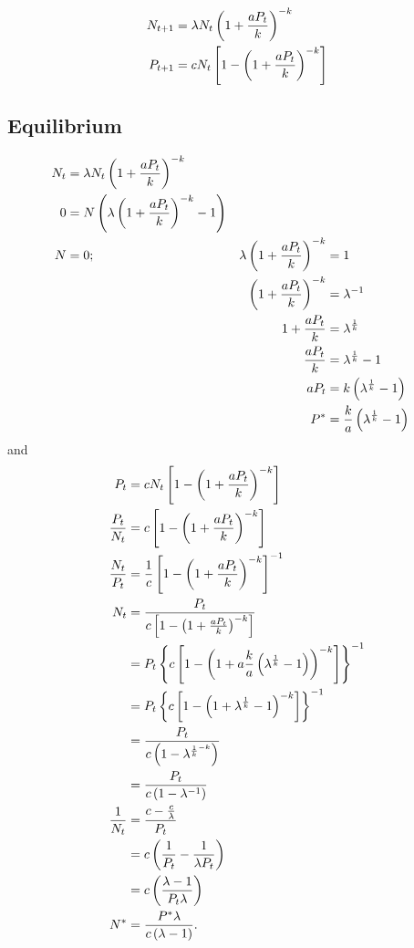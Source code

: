 \documentclass{article}
\begin{document}
\begin{align*}
    N_{t+1} &= \lambda N_t \left(1+\frac{aP_t}{k}\right)^{-k}\\
    P_{t+1} &= c N_t \left[1-\left(1+\frac{aP_t}{k}\right)^{-k}\right]
\end{align*}

\subsection{Equilibrium}
\begin{alignat*}{4}
    N_t &= \lambda N_t \left(1+\frac{aP_t}{k}\right)^{-k}\\
    0   &= N\left(\lambda\left(1+\frac{aP_t}{k}\right)^{-k} - 1\right)\\
    N   &= 0;
        & \lambda \left(1+\frac{aP_t}{k}\right)^{-k} &= 1\\
    &   &     \left(1+\frac{aP_t}{k}\right)^{-k}     &= \lambda^{-1}\\
    &   &     1+\frac{aP_t}{k}               &= \lambda^{\frac{1}{k}}\\
    &   &     \frac{aP_t}{k}                 &= \lambda^{\frac{1}{k}} -1\\
    &   &     aP_t                           &= k\left(\lambda^{\frac{1}{k}} - 1\right)\\
    &   &     P^*                            &= \frac{k}{a} \left(\lambda^{\frac{1}{k}} - 1\right)
\end{alignat*}
and
\begin{align*}
    P_t &= c N_t \left[1 - \left(1+\frac{aP_t}{k}\right)^{-k}\right]\\
    \frac{P_t}{N_t} &= c \left[1-\left(1+\frac{aP_t}{k}\right)^{-k}\right]\\
    \frac{N_t}{P_t} &= \frac{1}{c}\left[ 1 - \left(1+\frac{aP_t}{k}\right)^{-k} \right]^{-1}\\
    N_t &= \frac{P_t}{c\left[ 1 - \left(1+\frac{aP_t}{k}\right)^{-k} \right]}\\
    &= P_t \left\{c\left[ 1 - \left(1 + a \frac{k}{a}\left(\lambda^{\frac{1}{k}} - 1\right)\right)^{-k} \right]\right\}^{-1}\\
    &= P_t\left\{c \left[ 1 - \left(1 + \lambda^{\frac{1}{k}} - 1\right)^{-k} \right]\right\}^{-1}\\
    &= \frac{P_t}{c \left(1 - \lambda^{\frac{1}{k}^{-k}}\right)}\\
    &= \frac{P_t}{c \left(1-\lambda^{-1}\right)}\\
    \frac{1}{N_t} &= \frac{c - \frac{c}{\lambda}}{P_t}\\
    &= c \left(\frac{1}{P_t} -\frac{1}{\lambda P_t}\right)\\
    &= c \left(\frac{\lambda - 1}{P_t \lambda}\right)\\
    N^* &= \frac{P^*\lambda}{c\left(\lambda-1\right)}.
\end{align*}
\end{document}
